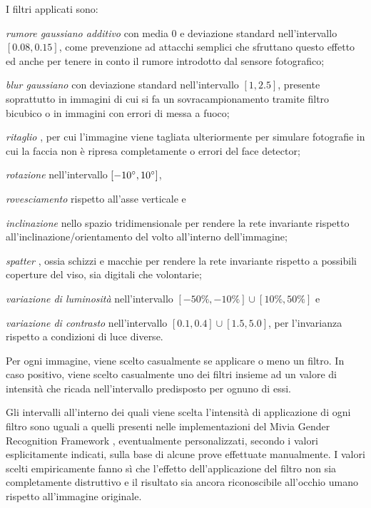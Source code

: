 I filtri applicati sono:
\begin{enumerate*}[label={\alph*)}]
\item \emph{rumore gaussiano additivo} con media 0 e deviazione standard nell'intervallo $[0.08, 0.15]$, come prevenzione ad attacchi semplici che sfruttano questo effetto ed anche per tenere in conto il rumore introdotto dal sensore fotografico;
\item \emph{blur gaussiano} con deviazione standard nell'intervallo $[1, 2.5]$, presente soprattutto in immagini di cui si fa un sovracampionamento tramite filtro bicubico o in immagini con errori di messa a fuoco;
\item \emph{ritaglio} \cite{miviagender}, per cui l'immagine viene tagliata ulteriormente per simulare fotografie in cui la faccia non è ripresa completamente o errori del face detector;
\item \emph{rotazione} nell'intervallo $[-10 \degree, 10 \degree ]$, \item \emph{rovesciamento} rispetto all'asse verticale e \item \emph{inclinazione} \cite{miviagender} nello spazio tridimensionale per rendere la rete invariante rispetto all'inclinazione/orientamento del volto all'interno dell'immagine;
\item \emph{spatter} \cite{miviagender}, ossia schizzi e macchie per rendere la rete invariante rispetto a possibili coperture del viso, sia digitali che volontarie;
\item \emph{variazione di luminosità} nell'intervallo $[-50\%, -10\%] \cup [10\%, 50\%]$ e \item \emph{variazione di contrasto} nell'intervallo $[0.1, 0.4] \cup [1.5, 5.0]$, per l'invarianza rispetto a condizioni di luce diverse.
\end{enumerate*}
Per ogni immagine, viene scelto casualmente se applicare o meno un filtro. In caso positivo, viene scelto casualmente uno dei filtri insieme ad un valore di intensità che ricada nell'intervallo predisposto per ognuno di essi.

Gli intervalli all'interno dei quali viene scelta l'intensità di applicazione di ogni filtro sono uguali a quelli presenti nelle implementazioni del Mivia Gender Recognition Framework \cite{miviagender}, eventualmente personalizzati, secondo i valori esplicitamente indicati, sulla base di alcune prove effettuate manualmente.
I valori scelti empiricamente fanno sì che l'effetto dell'applicazione del filtro non sia completamente distruttivo e il risultato sia ancora riconoscibile all'occhio umano rispetto all'immagine originale. 

